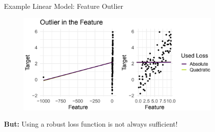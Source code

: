 \begin{vbframe}{Example Linear Model: Feature Outlier}
    
    \begin{figure}
        \includegraphics[width = 0.9\textwidth]{figure_man/linear-model06.png}
    \end{figure}
    
    \medskip
    
    \textbf{But:} Using a robust loss function is not always sufficient!
\end{vbframe}

